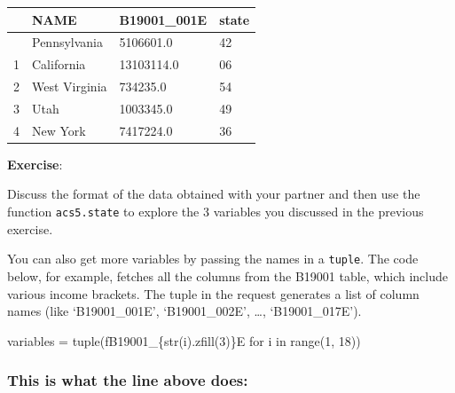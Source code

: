 \documentclass[
  letterpaper,
  DIV=11,
  numbers=noendperiod]{scrreprt}
\newenvironment{Shaded}{\begin{snugshade}}{\end{snugshade}}
\newcommand{\BuiltInTok}[1]{\textcolor[rgb]{0.00,0.23,0.31}{#1}}
\newcommand{\ControlFlowTok}[1]{\textcolor[rgb]{0.00,0.23,0.31}{#1}}
\newcommand{\DecValTok}[1]{\textcolor[rgb]{0.68,0.00,0.00}{#1}}
\newcommand{\KeywordTok}[1]{\textcolor[rgb]{0.00,0.23,0.31}{#1}}
\newcommand{\NormalTok}[1]{\textcolor[rgb]{0.00,0.23,0.31}{#1}}
\newcommand{\OperatorTok}[1]{\textcolor[rgb]{0.37,0.37,0.37}{#1}}
\newcommand{\SpecialCharTok}[1]{\textcolor[rgb]{0.37,0.37,0.37}{#1}}
\newcommand{\SpecialStringTok}[1]{\textcolor[rgb]{0.13,0.47,0.30}{#1}}
\begin{document}
\begin{longtable}[]{@{}llll@{}}
\toprule\noalign{}
& NAME & B19001\_001E & state \\
\midrule\noalign{}
\endhead
\bottomrule\noalign{}
\endlastfoot
0 & Pennsylvania & 5106601.0 & 42 \\
1 & California & 13103114.0 & 06 \\
2 & West Virginia & 734235.0 & 54 \\
3 & Utah & 1003345.0 & 49 \\
4 & New York & 7417224.0 & 36 \\
\end{longtable}

\textbf{Exercise}:

Discuss the format of the data obtained with your partner and then use
the function \texttt{acs5.state} to explore the 3 variables you
discussed in the previous exercise.

You can also get more variables by passing the names in a
\texttt{tuple}. The code below, for example, fetches all the columns
from the B19001 table, which include various income brackets. The tuple
in the request generates a list of column names (like `B19001\_001E',
`B19001\_002E', \ldots, `B19001\_017E').

\begin{Shaded}
\begin{Highlighting}[]
\NormalTok{variables }\OperatorTok{=} \BuiltInTok{tuple}\NormalTok{(}\SpecialStringTok{f\textquotesingle{}B19001\_}\SpecialCharTok{\{}\BuiltInTok{str}\NormalTok{(i)}\SpecialCharTok{.}\NormalTok{zfill(}\DecValTok{3}\NormalTok{)}\SpecialCharTok{\}}\SpecialStringTok{E\textquotesingle{}} \ControlFlowTok{for}\NormalTok{ i }\KeywordTok{in} \BuiltInTok{range}\NormalTok{(}\DecValTok{1}\NormalTok{, }\DecValTok{18}\NormalTok{))}
\end{Highlighting}
\end{Shaded}

\hypertarget{this-is-what-the-line-above-does}{%
\subsubsection{This is what the line above
does:}\label{this-is-what-the-line-above-does}}
\end{document}
